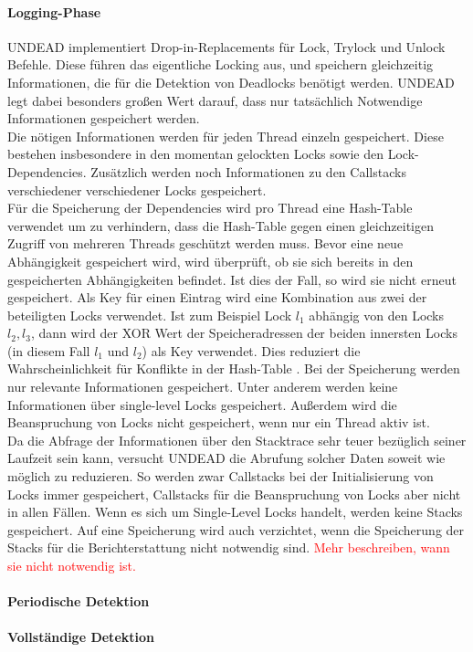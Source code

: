 \paragraph*{Logging-Phase} UNDEAD implementiert Drop-in-Replacements für Lock,
Trylock und Unlock Befehle. Diese führen das eigentliche Locking aus, und 
speichern gleichzeitig Informationen, die für die Detektion von Deadlocks 
benötigt werden. UNDEAD legt dabei besonders großen Wert darauf, dass nur tatsächlich
Notwendige Informationen gespeichert werden.\\
Die nötigen Informationen werden für jeden Thread einzeln gespeichert. Diese 
bestehen insbesondere in den momentan gelockten Locks sowie den Lock-Dependencies.
Zusätzlich werden noch Informationen zu den Callstacks verschiedener verschiedener 
Locks gespeichert.\\
Für die Speicherung der Dependencies wird pro Thread eine Hash-Table verwendet um 
zu verhindern, dass die Hash-Table gegen einen gleichzeitigen Zugriff von 
mehreren Threads geschützt werden muss.
Bevor eine neue Abhängigkeit gespeichert wird, wird überprüft, ob sie sich 
bereits in den gespeicherten Abhängigkeiten befindet. Ist dies der Fall, so 
wird sie nicht erneut gespeichert.
Als Key für einen Eintrag wird eine Kombination aus zwei der beteiligten Locks 
verwendet. Ist zum Beispiel Lock $l_1$
abhängig von den Locks ${l_2, l_3}$, dann wird der XOR Wert der Speicheradressen
der beiden innersten Locks (in diesem Fall $l_1$ und $l_2$) als Key verwendet.
Dies reduziert die Wahrscheinlichkeit für Konflikte in der Hash-Table \cite{zhou}.
Bei der Speicherung werden nur relevante Informationen gespeichert. Unter anderem 
werden keine Informationen über single-level Locks gespeichert. Außerdem wird die 
Beanspruchung von Locks nicht gespeichert, wenn nur ein Thread aktiv ist. 
\\
Da die Abfrage der Informationen über den Stacktrace sehr teuer bezüglich 
seiner Laufzeit sein kann, versucht UNDEAD die Abrufung solcher Daten 
soweit wie möglich zu reduzieren. So werden zwar Callstacks bei der Initialisierung 
von Locks immer gespeichert, Callstacks für die Beanspruchung von Locks aber 
nicht in allen Fällen. Wenn es sich um Single-Level Locks handelt, werden keine 
Stacks gespeichert. Auf eine Speicherung wird auch verzichtet, wenn die Speicherung
der Stacks für die Berichterstattung nicht notwendig sind.
\textcolor{red}{Mehr beschreiben, wann sie nicht notwendig ist.}
\paragraph*{Periodische Detektion}


\paragraph*{Vollständige Detektion}

